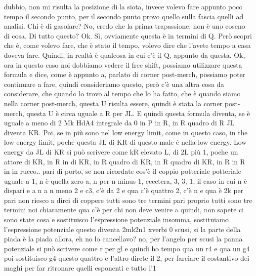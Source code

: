 \begin{soluzione}
{dubbio, non mi risulta la posizione di la siota, invece volevo fare appunto poco tempo il secondo punto, per il secondo punto provo quello sulla fascia quelli ad analisi. Chi è di gasolare? No, credo che la prima trapassione, non è uno coseno di cosa. Di tutto questo? Ok. Sì, ovviamente questa è in termini di Q. Però scopri che è, come volevo fare, che è stato il tempo, volevo dire che l'avete tempo a casa doveva fare. Quindi, in realtà è qualcosa in cui c'è il Q, appunto da questa. Ok, ora in questo caso noi dobbiamo vedere il free shift, possiamo utilizzare questa formula e dice, come è appunto a, parlato di corner post-merch, possiamo poter continuare a fare, quindi consideriamo questo, però c'è una altra cosa da considerare, che quando lo trovo al tempo che lo ha fatto, che è quando siamo nella corner post-merch, questa U risulta essere, quindi è stata la corner post-merch, questa U è circa uguale a R per JL. E quindi questa formula diventa, se è uguale a meno di 2 Mk HdA4 integrale da 0 in P in R, in R quadro di R JL diventa KR. Poi, se in più sono nel low energy limit, come in questo caso, in the low energy limit, poche questa JL di KR di questo male è nella low energy. Low energy da JL di KR si può scrivere come kR elevato L, di 2L più 1, poche un attore di KR, in R in di KR, in R quadro di KR, in R quadro di KR, in R in R in in rucco.. pari di porto, se non ricordate cos'è il coppio potteriale potteriale uguale a 1, n è quella zero a, n per n minus 1, eccetera, 3, 3, 1, il caso in cui n è dispari e a n a n meno 2 e c3, c'è da 2 e qua c'è quattro 2, c'è n e qua è 2k per pari non riesco a dirci di coppere tutti sono tre termini pari proprio tutti sono tre termini noi chiaramente qua c'è per chi non deve venire a quindi, non sapete ci sono state cosa e sostituisco l'espressione potenziale insomma, sostituiamo l'espressione potenziale questo diventa 2mk2n1 xverbi 0 scusi, si la parte della piada è la piada allora, eh no lo cancellavo? no, per l'angelo per scusi la panna potenziale si può scrivere come r per gl e quindi ho tempo qua un r4 e qua un g4 poi sostituisco g4 questo quattro e l'altro direte il 2, per farciare il costantivo dei maghi per far ritronare quelli esponenti e tutto l'1
   
}
\end{soluzione}
